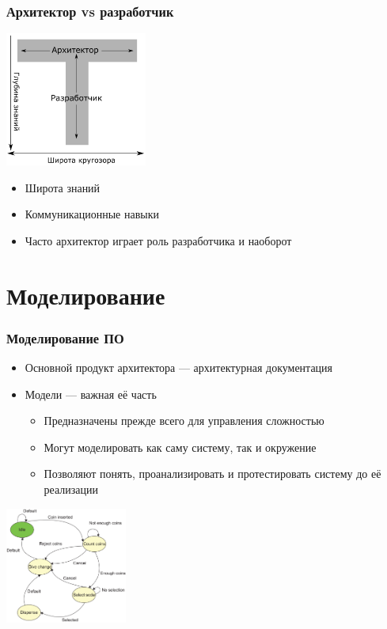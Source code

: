 \documentclass{../../slides-style}
\begin{document}
    \begin{frame}
        \frametitle{Архитектор vs разработчик}
        \begin{center}
            \includegraphics[width=0.35\textwidth]{architectVsDeveloper.png}
        \end{center}
        \begin{itemize}
            \item Широта знаний
            \item Коммуникационные навыки
            \item Часто архитектор играет роль разработчика и наоборот
        \end{itemize}
    \end{frame}

    \section{Моделирование}

    \begin{frame}
        \frametitle{Моделирование ПО}
        \begin{itemize}
            \item Основной продукт архитектора --- архитектурная документация
            \item Модели --- важная её часть
            \begin{itemize}
                \item Предназначены прежде всего для управления сложностью
                \item Могут моделировать как саму систему, так и окружение
                \item Позволяют понять, проанализировать и протестировать систему до её реализации
            \end{itemize}
        \end{itemize}
        \begin{center}
            \includegraphics[width=0.3\textwidth]{vendingMachine.png}
        \end{center}
    \end{frame}
\end{document}
